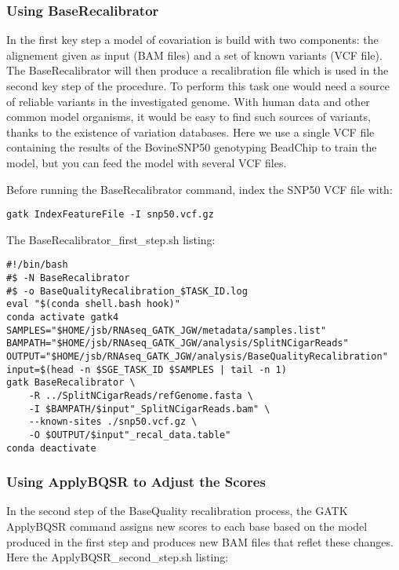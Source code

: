 \subsubsection{Using BaseRecalibrator}

In the first key step  a model of covariation is build with two components: the alignement given as input (BAM files) and a set of known variants (VCF file). The BaseRecalibrator will then produce a recalibration file which is used in the second key step of the procedure. To perform this task one would need a source of reliable variants in the investigated genome. With human data and other common model organisms, it would be easy to find such sources of variants, thanks to the existence of variation databases. Here we use a single VCF file containing the results of the BovineSNP50 genotyping BeadChip to train the model, but you can feed the model with several VCF files.

Before running the BaseRecalibrator command, index the SNP50 VCF file with:

\begin{verbatim}
gatk IndexFeatureFile -I snp50.vcf.gz
\end{verbatim}


The BaseRecalibrator\_first\_step.sh listing:
\begin{verbatim}
#!/bin/bash
#$ -N BaseRecalibrator
#$ -o BaseQualityRecalibration_$TASK_ID.log
eval "$(conda shell.bash hook)"
conda activate gatk4
SAMPLES="$HOME/jsb/RNAseq_GATK_JGW/metadata/samples.list"
BAMPATH="$HOME/jsb/RNAseq_GATK_JGW/analysis/SplitNCigarReads"
OUTPUT="$HOME/jsb/RNAseq_GATK_JGW/analysis/BaseQualityRecalibration"
input=$(head -n $SGE_TASK_ID $SAMPLES | tail -n 1)
gatk BaseRecalibrator \
	-R ../SplitNCigarReads/refGenome.fasta \
	-I $BAMPATH/$input"_SplitNCigarReads.bam" \
	--known-sites ./snp50.vcf.gz \
	-O $OUTPUT/$input"_recal_data.table"
conda deactivate
\end{verbatim}





\subsubsection{Using ApplyBQSR to Adjust the Scores}

In the second step of the BaseQuality recalibration process, the GATK ApplyBQSR command assigns new scores to each base based on the model produced in the first step and produces new BAM files that reflet these changes. Here the ApplyBQSR\_second\_step.sh listing:

